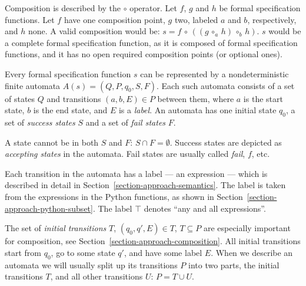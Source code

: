 \begin{mydef}\label{def-}
Composition is described by the $\circ$ operator. Let $f$, $g$ and $h$ be
formal specification functions. Let $f$ have one composition point, $g$ two,
labeled $a$ and $b$, respectively, and $h$ none. A valid composition would be:
$s = f \, \circ \, ((g \, \circ_{a} \, h) \, \circ_{b} \, h)$.  $s$ would be a
complete formal specification function, as it is composed of formal
specification functions, and it has no open required composition points (or
optional ones).
\end{mydef}

\begin{mydef}\label{def-}
Every formal specification function $s$ can be represented by a
nondeterministic finite automata $A(s) = (Q, P, q_0, S, F)$. Each such automata
consists of a set of states $Q$ and transitions $(a, b, E) \in P$ between them,
where $a$ is the start state, $b$ is the end state, and $E$ is a
\textit{label}. An automata has one initial state $q_0$, a set of
\textit{success states} $S$ and a set of \textit{fail states} $F$.
\end{mydef}

\begin{mydef}\label{def-}
A state cannot be in both $S$ and $F$: $S \cap F = \emptyset$. Success states
are depicted as \textit{accepting states} in the automata. Fail states are
usually called \textit{fail}, $f$, etc.
\end{mydef}

\begin{mydef}\label{def-}
Each transition in the automata has a label --- an expression --- which is
described in detail in Section~\ref{section-approach-semantics}. The label is
taken from the expressions in the Python functions, as shown in
Section~\ref{section-approach-python-subset}. The label $\top$ denotes ``any
and all expressions''.
\end{mydef}

\begin{mydef}\label{def-}
The set of \textit{initial transitions} $T$, $(q_0, q', E) \in T$, $T \subseteq
P$ are especially important for composition, see
Section~\ref{section-approach-composition}. All initial transitions start from
$q_0$, go to some state $q'$, and have some label $E$. When we describe an
automata we will usually split up its transitions $P$ into two parts, the
initial transitions $T$, and all other transitions $U$: $P = T \cup U$.
\end{mydef}

